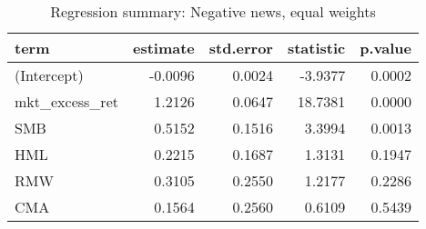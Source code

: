 \begin{table}[H]
\caption{Regression summary: Negative news, equal weights}
\centering
\begin{tabular}{lrrrr}
  \hline
term & estimate & std.error & statistic & p.value \\ 
  \hline
(Intercept) & -0.0096 & 0.0024 & -3.9377 & 0.0002 \\ 
  mkt\_excess\_ret & 1.2126 & 0.0647 & 18.7381 & 0.0000 \\ 
  SMB & 0.5152 & 0.1516 & 3.3994 & 0.0013 \\ 
  HML & 0.2215 & 0.1687 & 1.3131 & 0.1947 \\ 
  RMW & 0.3105 & 0.2550 & 1.2177 & 0.2286 \\ 
  CMA & 0.1564 & 0.2560 & 0.6109 & 0.5439 \\ 
   \hline
\end{tabular}
\label{tab: summary_neg_EW}
\end{table}

